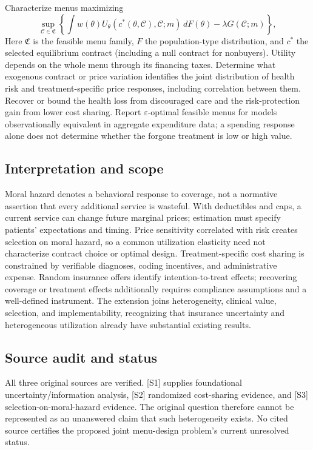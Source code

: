 \documentclass[11pt,a4paper]{article}
\begin{document}
Characterize menus maximizing
\[
 \sup_{\mathcal C\in\mathfrak C}\left\{\int w(\theta)U_\theta(c^*(\theta,\mathcal C),\mathcal C;m)\,dF(\theta)-\lambda G(\mathcal C;m)\right\},
\]
Here $\mathfrak C$ is the feasible menu family, $F$ the population-type distribution, and $c^*$ the selected equilibrium contract (including a null contract for nonbuyers). Utility depends on the whole menu through its financing taxes. Determine what exogenous contract or price variation identifies the joint distribution of health risk and treatment-specific price responses, including correlation between them. Recover or bound the health loss from discouraged care and the risk-protection gain from lower cost sharing. Report $\varepsilon$-optimal feasible menus for models observationally equivalent in aggregate expenditure data; a spending response alone does not determine whether the forgone treatment is low or high value.

\subsection*{Interpretation and scope}
Moral hazard denotes a behavioral response to coverage, not a normative assertion that every additional service is wasteful. With deductibles and caps, a current service can change future marginal prices; estimation must specify patients' expectations and timing. Price sensitivity correlated with risk creates selection on moral hazard, so a common utilization elasticity need not characterize contract choice or optimal design. Treatment-specific cost sharing is constrained by verifiable diagnoses, coding incentives, and administrative expense. Random insurance offers identify intention-to-treat effects; recovering coverage or treatment effects additionally requires compliance assumptions and a well-defined instrument. The extension joins heterogeneity, clinical value, selection, and implementability, recognizing that insurance uncertainty and heterogeneous utilization already have substantial existing results.

\subsection*{Source audit and status}
All three original sources are verified. [S1] supplies foundational uncertainty/information analysis, [S2] randomized cost-sharing evidence, and [S3] selection-on-moral-hazard evidence. The original question therefore cannot be represented as an unanswered claim that such heterogeneity exists. No cited source certifies the proposed joint menu-design problem's current unresolved status.
\end{document}
